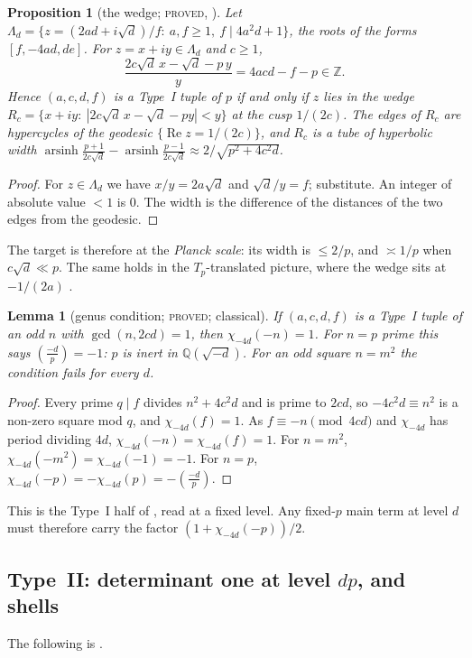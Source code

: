 \documentclass[10pt,reqno]{amsart}
\newtheorem{lemma}[theorem]{Lemma}
\newtheorem{proposition}[theorem]{Proposition}
\theoremstyle{definition}
\numberwithin{equation}{section}
\newcommand{\Z}{\mathbb Z}
\newcommand{\Q}{\mathbb Q}
\newcommand{\status}[1]{\textup{\textsc{#1}}}
\newcommand{\leg}[2]{\left(\frac{#1}{#2}\right)}
\begin{document}
\begin{proposition}[the wedge; \status{proved}, {\cite[Prop.~3.1]{O123}}]\label{prop:wedge}
Let $\Lambda_d=\{z=(2ad+i\sqrt d)/f:\ a,f\ge1,\ f\mid4a^2d+1\}$, the roots
of the forms $[f,-4ad,de]$. For $z=x+iy\in\Lambda_d$ and $c\ge1$,
\[\frac{2c\sqrt d\,x-\sqrt d-p\,y}{y}=4acd-f-p\in\Z.\]
Hence $(a,c,d,f)$ is a Type~I tuple of $p$ if and only if $z$ lies in the
wedge $R_c=\{x+iy:\ |2c\sqrt d\,x-\sqrt d-py|<y\}$ at the cusp $1/(2c)$.
The edges of $R_c$ are hypercycles of the geodesic $\{\operatorname{Re}z=1/(2c)\}$,
and $R_c$ is a tube of hyperbolic width
$\operatorname{arsinh}\frac{p+1}{2c\sqrt d}-\operatorname{arsinh}\frac{p-1}{2c\sqrt d}
\approx 2/\sqrt{p^2+4c^2d}$.
\end{proposition}
\begin{proof}
For $z\in\Lambda_d$ we have $x/y=2a\sqrt d$ and $\sqrt d/y=f$; substitute.
An integer of absolute value $<1$ is $0$. The width is the difference of the
distances of the two edges from the geodesic.
\end{proof}

The target is therefore at the \emph{Planck scale}: its width is
$\le2/p$, and $\asymp1/p$ when $c\sqrt d\ll p$. The same holds in the $T_p$-translated picture,
where the wedge sits at $-1/(2a)$ \cite[Prop.~3.2]{O123}.

\begin{lemma}[genus condition; \status{proved}; classical]\label{lem:genusI}
If $(a,c,d,f)$ is a Type~I tuple of an odd $n$ with $\gcd(n,2cd)=1$, then
$\chi_{-4d}(-n)=1$. For $n=p$ prime this says $\leg{-d}{p}=-1$: $p$ is
inert in $\Q(\sqrt{-d})$. For an odd square $n=m^2$ the condition fails for
every $d$.
\end{lemma}
\begin{proof}
Every prime $q\mid f$ divides $n^2+4c^2d$ and is prime to $2cd$, so
$-4c^2d\equiv n^2$ is a non-zero square mod $q$, and $\chi_{-4d}(f)=1$. As
$f\equiv-n\pmod{4cd}$ and $\chi_{-4d}$ has period dividing $4d$,
$\chi_{-4d}(-n)=\chi_{-4d}(f)=1$. For $n=m^2$,
$\chi_{-4d}(-m^2)=\chi_{-4d}(-1)=-1$. For $n=p$,
$\chi_{-4d}(-p)=-\chi_{-4d}(p)=-\leg{-d}{p}$.
\end{proof}
This is the Type~I half of \cite[Prop.~1.6]{ET}, read at a fixed level.
Any fixed-$p$ main term at level $d$ must therefore carry the factor
$(1+\chi_{-4d}(-p))/2$.

\subsection{Type~II: determinant one at level $dp$, and shells}
The following is \cite[Lemma~1.1, Props.~2.1, 2.5, 7.1, Lemma~6.1]{O128}.
\end{document}
